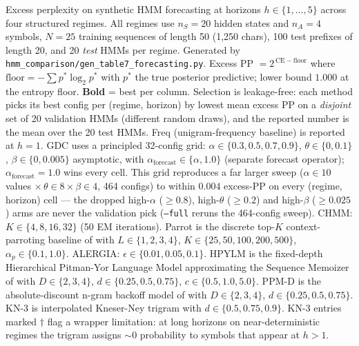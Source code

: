 \begin{table}[t]
\centering
\caption{Excess perplexity on synthetic HMM forecasting at horizons $h \in \{1, \ldots, 5\}$ across four structured regimes. All regimes use $n_S{=}20$ hidden states and $n_A{=}4$ symbols, $N{=}25$ training sequences of length 50 (1{,}250 chars), 100 test prefixes of length 20, and 20 \emph{test} HMMs per regime. Generated by \texttt{hmm\_comparison/gen\_table7\_forecasting.py}. Excess PP $= 2^{\,\mathrm{CE} - \mathrm{floor}}$ where $\mathrm{floor} = -\sum p^* \log_2 p^*$ with $p^*$ the true posterior predictive; lower bound $1.000$ at the entropy floor. \textbf{Bold} = best per column. Selection is leakage-free: each method picks its best config per (regime, horizon) by lowest mean excess PP on a \emph{disjoint} set of 20 validation HMMs (different random draws), and the reported number is the mean over the 20 test HMMs. Freq (unigram-frequency baseline) is reported at $h{=}1$. GDC uses a principled 32-config grid: $\alpha \in \{0.3, 0.5, 0.7, 0.9\}$, $\theta \in \{0, 0.1\}$, $\beta \in \{0, 0.005\}$ asymptotic, with $\alpha_{\mathrm{forecast}} \in \{\alpha, 1.0\}$ (separate forecast operator); $\alpha_{\mathrm{forecast}}{=}1.0$ wins every cell. This grid reproduces a far larger sweep ($\alpha\in10$ values $\times\,\theta\in8\times\beta\in4$, 464 configs) to within $0.004$ excess-PP on every (regime, horizon) cell --- the dropped high-$\alpha$ ($\ge0.8$), high-$\theta$ ($\ge0.2$) and high-$\beta$ ($\ge0.025$) arms are never the validation pick (\texttt{--full} reruns the 464-config sweep). CHMM: $K \in \{4, 8, 16, 32\}$ (50 EM iterations). Parrot is the discrete top-$K$ context-parroting baseline of \citet{zhang2025parrot} with $L \in \{1,2,3,4\}$, $K \in \{25, 50, 100, 200, 500\}$, $\alpha_p \in \{0.1, 1.0\}$. ALERGIA: $\epsilon \in \{0.01, 0.05, 0.1\}$. HPYLM is the fixed-depth Hierarchical Pitman-Yor Language Model approximating the Sequence Memoizer of \citet{wood2009sequencememoizer} with $D \in \{2, 3, 4\}$, $d \in \{0.25, 0.5, 0.75\}$, $c \in \{0.5, 1.0, 5.0\}$. PPM-D is the absolute-discount n-gram backoff model of \citet{howard1993ppmd} with $D \in \{2, 3, 4\}$, $d \in \{0.25, 0.5, 0.75\}$. KN-3 is interpolated Kneser-Ney trigram with $d \in \{0.5, 0.75, 0.9\}$. KN-3 entries marked $\dagger$ flag a wrapper limitation: at long horizons on near-deterministic regimes the trigram assigns ${\sim}0$ probability to symbols that appear at $h{>}1$.}

\end{table}

